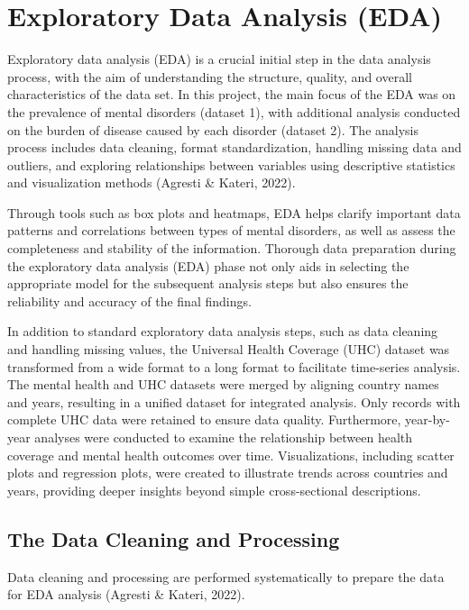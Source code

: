 \section{Exploratory Data Analysis (EDA)}
\label{sec:eda} %

Exploratory data analysis (EDA) is a crucial initial step in the data analysis process, with the aim of understanding the structure, quality, and overall characteristics of the data set. In this project, the main focus of the EDA was on the prevalence of mental disorders (dataset 1), with additional analysis conducted on the burden of disease caused by each disorder (dataset 2). The analysis process includes data cleaning, format standardization, handling missing data and outliers, and exploring relationships between variables using descriptive statistics and visualization methods (Agresti \& Kateri, 2022).

Through tools such as box plots and heatmaps, EDA helps clarify important data patterns and correlations between types of mental disorders, as well as assess the completeness and stability of the information. Thorough data preparation during the exploratory data analysis (EDA) phase not only aids in selecting the appropriate model for the subsequent analysis steps but also ensures the reliability and accuracy of the final findings.

In addition to standard exploratory data analysis steps, such as data cleaning and handling missing values, the Universal Health Coverage (UHC) dataset was transformed from a wide format to a long format to facilitate time-series analysis. The mental health and UHC datasets were merged by aligning country names and years, resulting in a unified dataset for integrated analysis. Only records with complete UHC data were retained to ensure data quality. Furthermore, year-by-year analyses were conducted to examine the relationship between health coverage and mental health outcomes over time. Visualizations, including scatter plots and regression plots, were created to illustrate trends across countries and years, providing deeper insights beyond simple cross-sectional descriptions.

\subsection{The Data Cleaning and Processing}
Data cleaning and processing are performed systematically to prepare the data for EDA analysis (Agresti \& Kateri, 2022).
